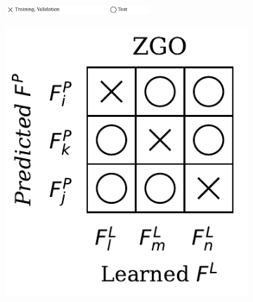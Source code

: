     \begin{figure}[H]
        \centering
        \begin{subfigure}[b]{\textwidth}
            \centering
            \includegraphics[width=0.6\textwidth]{img/datasets/_legend_theory.pdf}
        \end{subfigure}
        \vspace{-0.2cm} %

        \begin{subfigure}[b]{0.17\textwidth}
            \includegraphics[width=\textwidth]{img/datasets/_ZGO.pdf}
        \end{subfigure}
        \hfill
        \begin{subfigure}[b]{0.17\textwidth}

\end{subfigure}
\end{figure}
